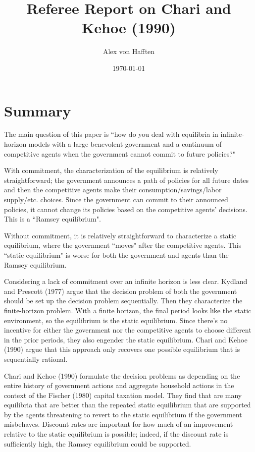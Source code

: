 \documentclass{article}
\title{Referee Report on Chari and Kehoe (1990)}
\author{Alex von Hafften}
\date{\today}
\begin{document}
\maketitle

\section{Summary}

The main question of this paper is ``how do you deal with equilibria in infinite-horizon models with a large benevolent government and a continuum of competitive agents when the government cannot commit to future policies?"

With commitment, the characterization of the equilibrium is relatively straightforward; the government announces a path of policies for all future dates and then the competitive agents make their consumption/savings/labor supply/etc. choices.  Since the government can commit to their announced policies, it cannot change its policies based on the competitive agents' decisions. This is a ``Ramsey equilibrium".  

Without commitment, it is relatively straightforward to characterize a static equilibrium, where the government ``moves" after the competitive agents.  This ``static equilibrium" is worse for both the government and agents than the Ramsey equilibrium.

Considering a lack of commitment over an infinite horizon is less clear. Kydland and Prescott (1977) argue that the decision problem of both the government should be set up the decision problem sequentially. Then they characterize the finite-horizon problem.  With a finite horizon, the final period looks like the static environment, so the equilibrium is the static equilibrium. Since there's no incentive for either the government nor the competitive agents to choose different in the prior periods, they also engender the static equilibrium.  Chari and Kehoe (1990) argue that this approach only recovers one possible equilibrium that is sequentially rational.

Chari and Kehoe (1990) formulate the decision problems as depending on the entire history of government actions and aggregate household actions in the context of the Fischer (1980) capital taxation model. They find that are many equilibria that are better than the repeated static equilibrium that are supported by the agents threatening to revert to the static equilibrium if the government misbehaves. Discount rates are important for how much of an improvement relative to the static equilibrium is possible; indeed, if the discount rate is sufficiently high, the Ramsey equilibrium could be supported.
\end{document}
